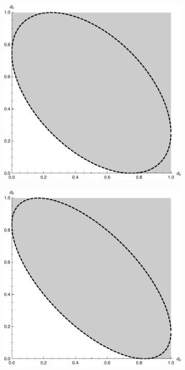 \begin{figure}
\begin{subfigure}[t]{0.4\textwidth}
  \end{subfigure}\\
  \begin{subfigure}[t]{0.4\textwidth}
    \includegraphics[width=\textwidth]{fourier-ur-4}
  \end{subfigure}\quad
  \begin{subfigure}[t]{0.4\textwidth}
    \includegraphics[width=\textwidth]{fourier-ur-6}

\end{subfigure}
\end{figure}
